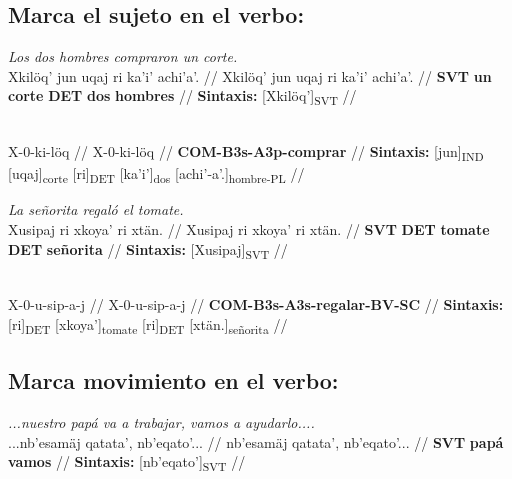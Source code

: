 \documentclass{article}%
\begin{document}
\subsection{Marca el sujeto en el verbo:}%
\label{subsec:Marcaelsujetoenelverbo}%

%
\par\medskip%
\ex
\textit{Los dos hombres compraron un corte.} \\
\begingl
\gla Xkilöq' jun uqaj ri ka'i' achi'a'. //
\glb Xkilöq' jun uqaj ri ka'i' achi'a'. //
\glc \textbf{SVT} \textbf{un} \textbf{corte} \textbf{DET} \textbf{dos} \textbf{hombres} //
\glft \textbf{Sintaxis:} [Xkilöq']\textsubscript{SVT} //
\endgl
\xe
%
\medskip%
\par\medskip%
\ex
\textit{} \\
\begingl
\gla X-0-ki-löq //
\glb X-0-ki-löq //
\glc \textbf{COM-}\textbf{B3s-}\textbf{A3p-}\textbf{comprar} //
\glft \textbf{Sintaxis:} [jun]\textsubscript{IND} [uqaj]\textsubscript{corte} [ri]\textsubscript{DET} [ka'i']\textsubscript{dos} [achi'-a'.]\textsubscript{hombre-PL} //
\endgl
\xe
%
\medskip%
\par\medskip%
\ex
\textit{La señorita regaló el tomate.} \\
\begingl
\gla Xusipaj ri xkoya' ri xtän. //
\glb Xusipaj ri xkoya' ri xtän. //
\glc \textbf{SVT} \textbf{DET} \textbf{tomate} \textbf{DET} \textbf{señorita} //
\glft \textbf{Sintaxis:} [Xusipaj]\textsubscript{SVT} //
\endgl
\xe
%
\medskip%
\par\medskip%
\ex
\textit{} \\
\begingl
\gla X-0-u-sip-a-j //
\glb X-0-u-sip-a-j //
\glc \textbf{COM-}\textbf{B3s-}\textbf{A3s-}\textbf{regalar-}\textbf{BV-}\textbf{SC} //
\glft \textbf{Sintaxis:} [ri]\textsubscript{DET} [xkoya']\textsubscript{tomate} [ri]\textsubscript{DET} [xtän.]\textsubscript{señorita} //
\endgl
\xe
%
\medskip%
\subsection{Marca movimiento en el verbo:}%
\label{subsec:Marcamovimientoenelverbo}%

%
\par\medskip%
\ex
\textit{...nuestro papá va a trabajar, vamos a ayudarlo....} \\
\begingl
\gla ...nb'esamäj qatata', nb'eqato'... //
\glb nb'esamäj qatata', nb'eqato'... //
\glc \textbf{SVT} \textbf{papá} \textbf{vamos} //
\glft \textbf{Sintaxis:} [nb'eqato']\textsubscript{SVT} //
\endgl
\xe
%
\medskip

%
\end{document}
